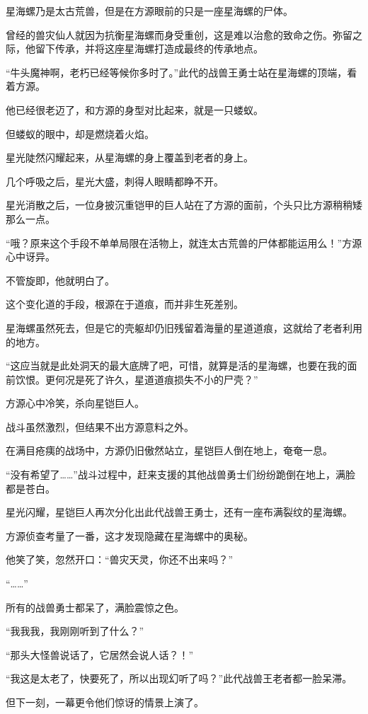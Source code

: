 \begin{this_body}
星海螺乃是太古荒兽，但是在方源眼前的只是一座星海螺的尸体。

曾经的兽灾仙人就因为抗衡星海螺而身受重创，这是难以治愈的致命之伤。弥留之际，他留下传承，并将这座星海螺打造成最终的传承地点。

“牛头魔神啊，老朽已经等候你多时了。”此代的战兽王勇士站在星海螺的顶端，看着方源。

他已经很老迈了，和方源的身型对比起来，就是一只蝼蚁。

但蝼蚁的眼中，却是燃烧着火焰。

星光陡然闪耀起来，从星海螺的身上覆盖到老者的身上。

几个呼吸之后，星光大盛，刺得人眼睛都睁不开。

星光消散之后，一位身披沉重铠甲的巨人站在了方源的面前，个头只比方源稍稍矮那么一点。

“哦？原来这个手段不单单局限在活物上，就连太古荒兽的尸体都能运用么！”方源心中讶异。

不管旋即，他就明白了。

这个变化道的手段，根源在于道痕，而并非生死差别。

星海螺虽然死去，但是它的壳躯却仍旧残留着海量的星道道痕，这就给了老者利用的地方。

“这应当就是此处洞天的最大底牌了吧，可惜，就算是活的星海螺，也要在我的面前饮恨。更何况是死了许久，星道道痕损失不小的尸壳？”

方源心中冷笑，杀向星铠巨人。

战斗虽然激烈，但结果不出方源意料之外。

在满目疮痍的战场中，方源仍旧傲然站立，星铠巨人倒在地上，奄奄一息。

“没有希望了……”战斗过程中，赶来支援的其他战兽勇士们纷纷跪倒在地上，满脸都是苍白。

星光闪耀，星铠巨人再次分化出此代战兽王勇士，还有一座布满裂纹的星海螺。

方源侦查考量了一番，这才发现隐藏在星海螺中的奥秘。

他笑了笑，忽然开口：“兽灾天灵，你还不出来吗？”

“……”

所有的战兽勇士都呆了，满脸震惊之色。

“我我我，我刚刚听到了什么？”

“那头大怪兽说话了，它居然会说人话？！”

“我这是太老了，快要死了，所以出现幻听了吗？”此代战兽王老者都一脸呆滞。

但下一刻，一幕更令他们惊讶的情景上演了。


\end{this_body}
